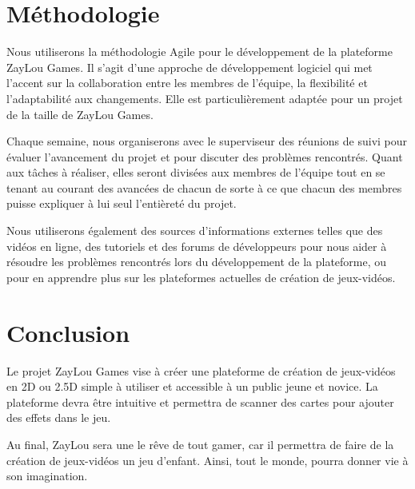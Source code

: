 \documentclass{article}                             %
\begin{document}
\section{Méthodologie}                              %
\label{sec:methodologie}                                    %
Nous utiliserons la méthodologie Agile pour le développement de la plateforme ZayLou
Games. Il s'agit d'une approche de développement logiciel qui met l'accent sur
la collaboration entre les membres de l'équipe, la flexibilité et l'adaptabilité aux
changements. Elle est particulièrement adaptée pour un projet de la taille de ZayLou Games.

Chaque semaine, nous organiserons avec le superviseur des réunions de suivi pour évaluer 
l'avancement du projet et pour discuter des problèmes rencontrés. Quant aux tâches à réaliser,
elles seront divisées aux membres de l'équipe tout en se tenant au courant
des avancées de chacun de sorte à ce que chacun des membres puisse expliquer à lui seul l'entièreté
du projet.

Nous utiliserons également des sources d'informations externes telles que des vidéos en ligne,
des tutoriels et des forums de développeurs pour nous aider à résoudre les problèmes
rencontrés lors du développement de la plateforme, ou pour en apprendre plus sur les plateformes
actuelles de création de jeux-vidéos.

\section{Conclusion}                                %
\label{sec:conclusion}                             %
Le projet ZayLou Games vise à créer une plateforme de création de jeux-vidéos en 2D ou 2.5D 
simple à utiliser et accessible à un public jeune et novice. La plateforme devra être intuitive 
et permettra de scanner des cartes pour ajouter des effets dans le jeu.

Au final, ZayLou sera une le rêve de tout gamer, car il permettra de faire de la
création de jeux-vidéos un jeu d'enfant. Ainsi, tout le monde, pourra donner vie à son 
imagination.
\end{document}
